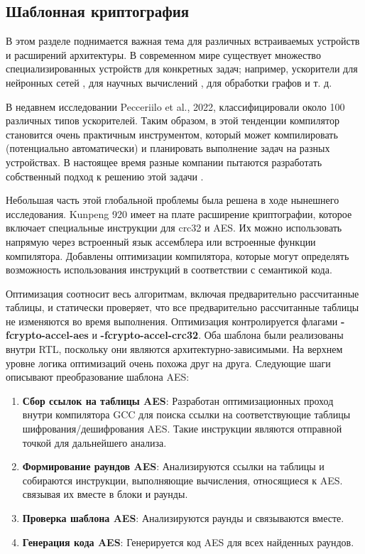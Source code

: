 \subsection{Шаблонная криптография}
В этом разделе поднимается важная тема для различных встраиваемых устройств и расширений архитектуры. В современном мире существует множество специализированных устройств для конкретных задач; например, ускорители для нейронных сетей \cite{chen2020survey}, для научных вычислений \cite{weber2010comparing}, для обработки графов \cite{rahman2020graphpulse} и т. д.

В недавнем исследовании \cite{peccerillo2022survey} Pecceriilo et al., 2022, классифицировали около 100 различных типов
ускорителей. Таким образом, в этой тенденции компилятор становится очень практичным инструментом, который может компилировать (потенциально автоматически) и планировать выполнение задач на разных устройствах. В настоящее время разные компании пытаются разработать собственный подход к решению этой задачи \cite{tavarageri2019automatic,chen2022case,kovac2022towards}.

Небольшая часть этой глобальной проблемы была решена в ходе нынешнего исследования. Kunpeng 920 имеет на плате расширение криптографии, которое включает специальные инструкции для crc32 и AES. Их можно использовать напрямую через встроенный язык ассемблера или встроенные функции компилятора. Добавлены оптимизации компилятора, которые могут определять возможность использования инструкций в соответствии с семантикой кода.

Оптимизация соотносит весь алгоритмам, включая предварительно рассчитанные таблицы, и статически проверяет, что все предварительно рассчитанные таблицы не изменяются во время выполнения. Оптимизация контролируется флагами \textbf{-fcrypto-accel-aes} и \textbf{-fcrypto-accel-crc32}. Оба шаблона были реализованы внутри RTL, поскольку они являются  архитектурно-зависимыми. На верхнем уровне логика оптимизаций очень похожа друг на друга. Следующие шаги описывают преобразование шаблона AES:

\begin{enumerate}
	\item \textbf{Сбор ссылок на таблицы AES}: Разработан оптимизационных проход внутри компилятора GCC для поиска ссылки на соответствующие таблицы шифрования/дешифрования AES. Такие инструкции являются отправной точкой для дальнейшего анализа.
	\item \textbf{Формирование раундов AES}: Анализируются ссылки на таблицы и собираются инструкции, выполняющие вычисления, относящиеся к AES. связывая их вместе в блоки и раунды.
	\item \textbf{Проверка шаблона AES}: Анализируются раунды и связываются вместе.
	\item \textbf{Генерация кода AES}: Генерируется код AES для всех найденных раундов.
\end{enumerate}

